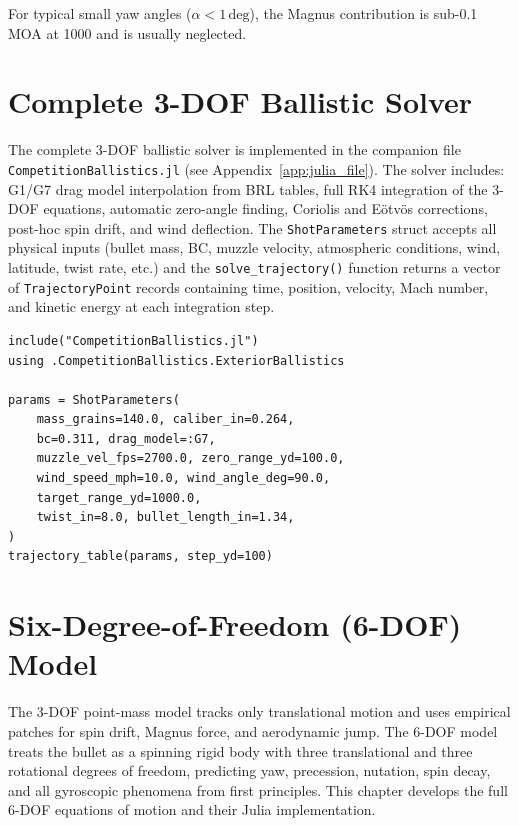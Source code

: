 \documentclass[11pt,twoside,openright]{report}
\begin{document}
For typical small yaw angles ($\alpha < 1\,\text{deg}$), the Magnus contribution is sub-0.1 MOA at \SI{1000}{\yard} and is usually neglected.


\chapter{Complete 3-DOF Ballistic Solver}
\label{ch:solver}

The complete 3-DOF ballistic solver is implemented in the companion file \texttt{CompetitionBallistics.jl} (see Appendix~\ref{app:julia_file}). The solver includes: G1/G7 drag model interpolation from BRL tables, full RK4 integration of the 3-DOF equations, automatic zero-angle finding, Coriolis and E\"otv\"os corrections, post-hoc spin drift, and wind deflection. The \texttt{ShotParameters} struct accepts all physical inputs (bullet mass, BC, muzzle velocity, atmospheric conditions, wind, latitude, twist rate, etc.) and the \texttt{solve\_trajectory()} function returns a vector of \texttt{TrajectoryPoint} records containing time, position, velocity, Mach number, and kinetic energy at each integration step.

\begin{lstlisting}[caption={Example: running the solver},label={lst:solver_example}]
include("CompetitionBallistics.jl")
using .CompetitionBallistics.ExteriorBallistics

params = ShotParameters(
    mass_grains=140.0, caliber_in=0.264,
    bc=0.311, drag_model=:G7,
    muzzle_vel_fps=2700.0, zero_range_yd=100.0,
    wind_speed_mph=10.0, wind_angle_deg=90.0,
    target_range_yd=1000.0,
    twist_in=8.0, bullet_length_in=1.34,
)
trajectory_table(params, step_yd=100)
\end{lstlisting}


\chapter{Six-Degree-of-Freedom (6-DOF) Model}
\label{ch:6dof}

The 3-DOF point-mass model tracks only translational motion and uses empirical patches for spin drift, Magnus force, and aerodynamic jump. The 6-DOF model treats the bullet as a spinning rigid body with three translational and three rotational degrees of freedom, predicting yaw, precession, nutation, spin decay, and all gyroscopic phenomena from first principles. This chapter develops the full 6-DOF equations of motion and their Julia implementation.
\end{document}
